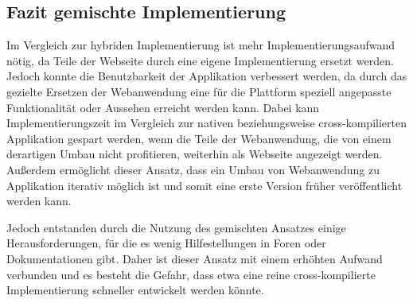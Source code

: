 \subsection{Fazit gemischte Implementierung}
Im Vergleich zur hybriden Implementierung ist mehr Implementierungsaufwand nötig, da Teile der Webseite durch eine eigene Implementierung ersetzt werden. Jedoch konnte die Benutzbarkeit der Applikation verbessert werden, da durch das gezielte Ersetzen der Webanwendung eine für die Plattform speziell angepasste Funktionalität oder Aussehen erreicht werden kann. Dabei kann Implementierungszeit im Vergleich zur nativen beziehungsweise cross-kompilierten Applikation gespart werden, wenn die Teile der Webanwendung, die von einem derartigen Umbau nicht profitieren, weiterhin als Webseite angezeigt werden.
Außerdem ermöglicht dieser Ansatz, dass ein Umbau von Webanwendung zu Applikation iterativ möglich ist und somit eine erste Version früher veröffentlicht werden kann.

Jedoch entstanden durch die Nutzung des gemischten Ansatzes einige Herausforderungen, für die es wenig Hilfestellungen in Foren oder Dokumentationen gibt. Daher ist dieser Ansatz mit einem erhöhten Aufwand verbunden und es besteht die Gefahr, dass etwa eine reine cross-kompilierte Implementierung schneller entwickelt werden könnte.